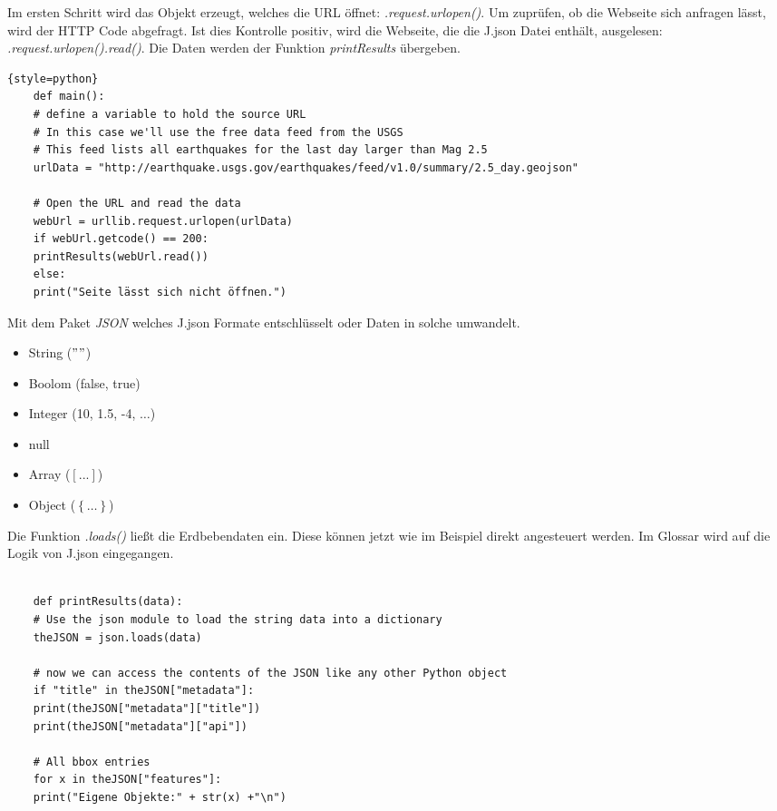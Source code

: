 Im ersten Schritt wird das Objekt erzeugt, welches die \gls{URL} öffnet: \textit{.request.urlopen()}. Um zuprüfen, ob die Webseite sich anfragen lässt, wird der \gls{HTTP} Code abgefragt. Ist dies Kontrolle positiv, wird die Webseite, die die \gls{J.json} Datei enthält, ausgelesen: \textit{.request.urlopen().read()}. Die Daten werden der Funktion \textit{printResults} übergeben.
\begin{lstlisting}{style=python}
	def main():
	# define a variable to hold the source URL
	# In this case we'll use the free data feed from the USGS
	# This feed lists all earthquakes for the last day larger than Mag 2.5
	urlData = "http://earthquake.usgs.gov/earthquakes/feed/v1.0/summary/2.5_day.geojson"
	
	# Open the URL and read the data
	webUrl = urllib.request.urlopen(urlData)
	if webUrl.getcode() == 200:
	printResults(webUrl.read())
	else:
	print("Seite lässt sich nicht öffnen.")
\end{lstlisting}

Mit dem Paket \textit{JSON} welches \gls{J.json} Formate entschlüsselt oder Daten in solche umwandelt.
\begin{itemize}
	\item String ($""$)
	\item Boolom (false, true)
	\item Integer (10, 1.5, -4, $\dots$)
	\item null 
	\item Array ($\left[...\right]$)
	\item Object ($\left\lbrace \dots \right\rbrace$)
\end{itemize}  Die Funktion \textit{.loads()} ließt die Erdbebendaten ein. Diese können jetzt wie im Beispiel direkt angesteuert werden. Im Glossar wird auf die Logik von \gls{J.json} eingegangen.
\begin{lstlisting}[style=python]
	
	def printResults(data):
	# Use the json module to load the string data into a dictionary
	theJSON = json.loads(data)
	
	# now we can access the contents of the JSON like any other Python object
	if "title" in theJSON["metadata"]:
	print(theJSON["metadata"]["title"])
	print(theJSON["metadata"]["api"])
	
	# All bbox entries
	for x in theJSON["features"]:
	print("Eigene Objekte:" + str(x) +"\n")
\end{lstlisting}

